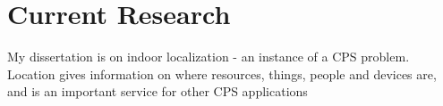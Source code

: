 \documentclass[10pt]{article}
\begin{document}




\section{Current Research}

My dissertation is on indoor localization - an instance of a CPS problem. Location gives information on where resources, things, people and devices are, and is an important service for other CPS applications
\end{document}
